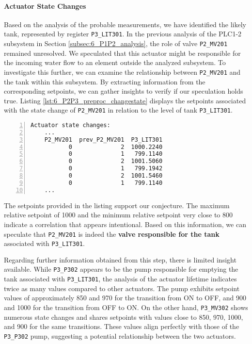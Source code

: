 \paragraph{Actuator State Changes}
\label{par:6_preproc_P2P3_actuator_state_changes}
Based on the analysis of the probable measurements, we have identified the likely tank, represented by register \texttt{P3\_LIT301}. In the previous analysis of the PLC1-2 subsystem in Section \ref{subsec:6_P1P2_analysis}, the role of valve \texttt{P2\_MV201} remained unresolved. We speculated that this actuator might be responsible for the incoming water flow to an element outside the analyzed subsystem. To investigate this further, we can examine the relationship between \texttt{P2\_MV201} and the tank within this subsystem. By extracting information from the corresponding setpoints, we can gather insights to verify if our speculation holds true. \newline 
Listing \ref{lst:6_P2P3_preproc_changestate} displays the setpoints associated with the state change of \texttt{P2\_MV201} in relation to the level of tank \texttt{P3\_LIT301}.

\begin{lstlisting}[language=bash, numbers=left, caption=P1\_P101 state changes in relation to P1\_LIT101, label=lst:6_P2P3_preproc_changestate]
	Actuator state changes:
	...
	P2_MV201  prev_P2_MV201  P3_LIT301
	       0              2  1000.2240
	       0              1   799.1140
	       0              2  1001.5060
	       0              1   799.1942
	       0              2  1001.5460
	       0              1   799.1140
	...
\end{lstlisting}

The setpoints provided in the listing support our conjecture. The maximum relative setpoint of 1000 and the minimum relative setpoint very close to 800 indicate a correlation that appears intentional. Based on this information, we can speculate that \texttt{P2\_MV201} is indeed the \textbf{valve responsible for the tank} associated with \texttt{P3\_LIT301}.

\bigskip
Regarding further information obtained from this step, there is limited insight available. While \texttt{P3\_P302} appears to be the pump responsible for emptying the tank associated with \texttt{P3\_LIT301}, the analysis of the actuator lifetime indicates twice as many values compared to other actuators. The pump exhibits setpoint values of approximately 850 and 970 for the transition from ON to OFF, and 900 and 1000 for the transition from OFF to ON. On the other hand, \texttt{P3\_MV302} shows numerous state changes and shares setpoints with values close to 850, 970, 1000, and 900 for the same transitions. These values align perfectly with those of the \texttt{P3\_P302} pump, suggesting a potential relationship between the two actuators.

